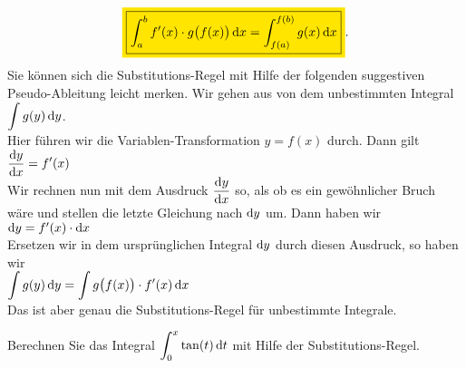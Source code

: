 \begin{equation}
  \label{eq:subst}
\colorbox{orange}{\framebox{$\ds\int_a^b f'(x) \cdot  g\bigl(f(x)\bigr)\, \dr x = \int_{f(a)}^{f(b)} g(x)\, \dr x$}}.  
\end{equation}
Sie k\"onnen sich die Substitutions-Regel mit Hilfe der folgenden suggestiven Pseudo-Ableitung
leicht merken.  Wir gehen aus von dem unbestimmten Integral 
\\[0.2cm]
\hspace*{1.3cm}
$\displaystyle\int g(y)\, \textrm{d} y$.
\\[0.2cm]
Hier f\"uhren wir die Variablen-Transformation $y = f(x)$ durch. Dann gilt 
\\[0.2cm]
\hspace*{1.3cm}
$\displaystyle \frac{\textrm{d} y}{\textrm{d} x} = f'(x)$
\\[0.2cm]
Wir rechnen nun mit dem Ausdruck $\displaystyle\frac{\textrm{d} y}{\textrm{d} x}$ so, als ob es ein gew\"ohnlicher Bruch w\"are und stellen die
letzte Gleichung nach $\textrm{d} y$ um.  Dann haben wir 
\\[0.2cm]
\hspace*{1.3cm}
$\textrm{d} y = f'(x)\cdot \textrm{d} x$
\\[0.2cm]
Ersetzen wir in dem urspr\"unglichen Integral $\textrm{d} y$ durch diesen Ausdruck, so haben wir 
\\[0.2cm]
\hspace*{1.3cm}
$\displaystyle\int g(y)\, \textrm{d} y = \int g\bigl(f(x)\bigr)\cdot f'(x)\, \textrm{d} x$
\\[0.2cm]
Das ist aber genau die Substitutions-Regel f\"ur unbestimmte Integrale.

\exercise
Berechnen Sie das Integral $\displaystyle \int_0^x \tan(t)\, \textrm{d} t$ mit Hilfe der Substitutions-Regel.  \eox


